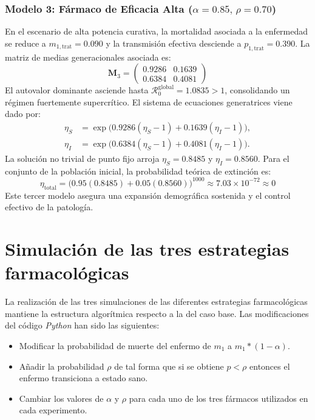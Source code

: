 \documentclass[graybox]{SNmult}
\begin{document}
	\subsubsection{Modelo 3: Fármaco de Eficacia Alta ($\alpha = 0.85, \, \rho = 0.70$)}
	En el escenario de alta potencia curativa, la mortalidad asociada a la enfermedad se reduce a $m_{1,\text{trat}} = 0.090$ y la transmisión efectiva desciende a $p_{1,\text{trat}} = 0.390$. La matriz de medias generacionales asociada es:
	\begin{equation}
		\mathbf{M}_3 = \begin{pmatrix}
			0.9286 & 0.1639 \\
			0.6384 & 0.4081
		\end{pmatrix}
	\end{equation}
	El autovalor dominante asciende hasta $\mathcal{R}_0^{\text{global}} = 1.0835 > 1$, consolidando un régimen fuertemente supercrítico. El sistema de ecuaciones generatrices viene dado por:
	\begin{align}
		\eta_S &= \exp\Big( 0.9286(\eta_S - 1) + 0.1639(\eta_I - 1) \Big), \\
		\eta_I &= \exp\Big( 0.6384(\eta_S - 1) + 0.4081(\eta_I - 1) \Big).
	\end{align}
	La solución no trivial de punto fijo arroja $\eta_S = 0.8485$ y $\eta_I = 0.8560$. Para el conjunto de la población inicial, la probabilidad teórica de extinción es:
	\begin{equation}
		\eta_{\text{total}} = \big( 0.95(0.8485) + 0.05(0.8560) \big)^{1000} \approx 7.03 \times 10^{-72} \approx 0
	\end{equation}
	Este tercer modelo asegura una expansión demográfica sostenida y el control efectivo de la patología.
	
	\section{Simulación de las tres estrategias farmacológicas}
	\label{sec:simulacion_farmacos}
	La realización de las tres simulaciones de las diferentes estrategias farmacológicas mantiene la estructura algorítmica respecto a la del caso base. Las modificaciones del código \textit{Python} han sido las siguientes: 
	\begin{itemize}
		\item Modificar la probabilidad de muerte del enfermo de $m_1$ a $m_1*(1-\alpha)$. 
		\item Añadir la probabilidad $\rho$ de tal forma que si se obtiene $p < \rho$ entonces el enfermo transiciona a estado sano. 
		\item Cambiar los valores de $\alpha$ y $\rho$ para cada uno de los tres fármacos utilizados en cada experimento. 
	\end{itemize}
	
\end{document}
